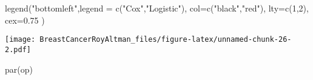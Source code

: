\documentclass[
]{article}
\newenvironment{Shaded}{\begin{snugshade}}{\end{snugshade}}
\newcommand{\AttributeTok}[1]{\textcolor[rgb]{0.77,0.63,0.00}{#1}}
\newcommand{\DecValTok}[1]{\textcolor[rgb]{0.00,0.00,0.81}{#1}}
\newcommand{\FloatTok}[1]{\textcolor[rgb]{0.00,0.00,0.81}{#1}}
\newcommand{\FunctionTok}[1]{\textcolor[rgb]{0.00,0.00,0.00}{#1}}
\newcommand{\NormalTok}[1]{#1}
\newcommand{\StringTok}[1]{\textcolor[rgb]{0.31,0.60,0.02}{#1}}
\begin{document}
\begin{Shaded}
\begin{Highlighting}[]
\FunctionTok{legend}\NormalTok{(}\StringTok{"bottomleft"}\NormalTok{,}\AttributeTok{legend =} \FunctionTok{c}\NormalTok{(}\StringTok{"Cox"}\NormalTok{,}\StringTok{"Logistic"}\NormalTok{),}
       \AttributeTok{col=}\FunctionTok{c}\NormalTok{(}\StringTok{"black"}\NormalTok{,}\StringTok{"red"}\NormalTok{),}
       \AttributeTok{lty=}\FunctionTok{c}\NormalTok{(}\DecValTok{1}\NormalTok{,}\DecValTok{2}\NormalTok{),}
       \AttributeTok{cex=}\FloatTok{0.75}
\NormalTok{)}
\end{Highlighting}
\end{Shaded}

\texttt{[image: BreastCancerRoyAltman\_files/figure-latex/unnamed-chunk-26-2.pdf]}

\begin{Shaded}
\begin{Highlighting}[]
\FunctionTok{par}\NormalTok{(op)}
\end{Highlighting}
\end{Shaded}
\end{document}
